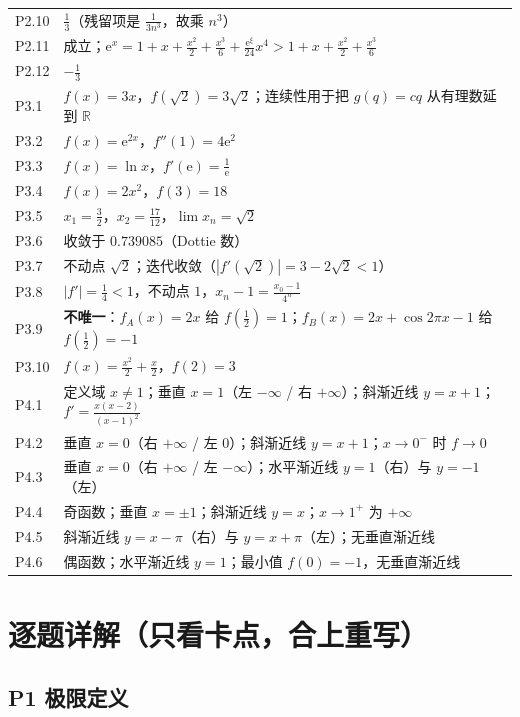 \documentclass[11pt,a4paper]{ctexart}
\newcommand{\R}{\mathbb{R}}
\newcommand{\abs}[1]{\left\lvert #1\right\rvert}
\newcommand{\ee}{\mathrm{e}}
\begin{document}
{\begin{longtable}{@{}p{1.25cm}p{12.3cm}@{}}
P2.10 & $\frac{1}{3}$（残留项是 $\frac{1}{3n^{3}}$，故乘 $n^{3}$）\\
P2.11 & 成立；$\ee^{x}=1+x+\frac{x^{2}}{2}+\frac{x^{3}}{6}+\frac{\ee^{\xi}}{24}x^{4}>1+x+\frac{x^{2}}{2}+\frac{x^{3}}{6}$\\
P2.12 & $-\frac{1}{3}$\\
\midrule
P3.1 & $f(x)=3x$，$f(\sqrt{2})=3\sqrt{2}$；连续性用于把 $g(q)=cq$ 从有理数延到 $\R$\\
P3.2 & $f(x)=\ee^{2x}$，$f''(1)=4\ee^{2}$\\
P3.3 & $f(x)=\ln x$，$f'(\ee)=\frac{1}{\ee}$\\
P3.4 & $f(x)=2x^{2}$，$f(3)=18$\\
P3.5 & $x_{1}=\frac{3}{2}$，$x_{2}=\frac{17}{12}$，$\lim x_{n}=\sqrt{2}$\\
P3.6 & 收敛于 $0.739085$（Dottie 数）\\
P3.7 & 不动点 $\sqrt{2}$；迭代收敛（$\abs{f'(\sqrt{2})}=3-2\sqrt{2}<1$）\\
P3.8 & $\abs{f'}=\frac{1}{4}<1$，不动点 $1$，$x_{n}-1=\frac{x_{0}-1}{4^{n}}$\\
P3.9 & \textbf{不唯一}：$f_{A}(x)=2x$ 给 $f(\frac{1}{2})=1$；$f_{B}(x)=2x+\cos 2\pi x-1$ 给 $f(\frac{1}{2})=-1$\\
P3.10 & $f(x)=\frac{x^{2}}{2}+\frac{x}{2}$，$f(2)=3$\\
\midrule
P4.1 & 定义域 $x\neq1$；垂直 $x=1$（左 $-\infty$ / 右 $+\infty$）；斜渐近线 $y=x+1$；$f'=\frac{x(x-2)}{(x-1)^{2}}$\\
P4.2 & 垂直 $x=0$（右 $+\infty$ / 左 $0$）；斜渐近线 $y=x+1$；$x\to0^{-}$ 时 $f\to 0$\\
P4.3 & 垂直 $x=0$（右 $+\infty$ / 左 $-\infty$）；水平渐近线 $y=1$（右）与 $y=-1$（左）\\
P4.4 & 奇函数；垂直 $x=\pm1$；斜渐近线 $y=x$；$x\to1^{+}$ 为 $+\infty$\\
P4.5 & 斜渐近线 $y=x-\pi$（右）与 $y=x+\pi$（左）；无垂直渐近线\\
P4.6 & 偶函数；水平渐近线 $y=1$；最小值 $f(0)=-1$，无垂直渐近线\\
\bottomrule
\end{longtable}}

\newpage
\section{逐题详解（只看卡点，合上重写）}

\subsection{P1 极限定义}
\end{document}
